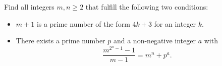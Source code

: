 Find all integers $m,n \geq 2$ that fulfill the following two conditions:
\begin{itemize}
    \item $m+1$ is a prime number of the form $4k + 3$ for an integer $k$. 
    \item There exists a prime number $p$ and a non-negative integer $a$ with
    $$\frac{m^{2^n-1}-1}{m-1} = m^n + p^a.$$
\end{itemize}
